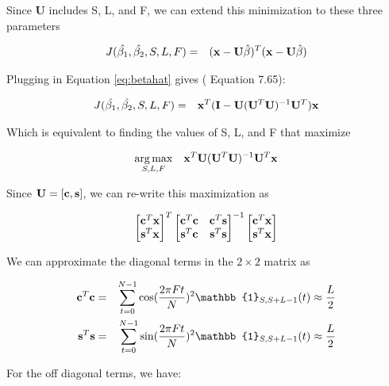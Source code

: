 \documentclass[11pt]{article}
\theoremstyle{plain}
\theoremstyle{definition}
\DeclareMathOperator*{\argmax}{arg\,max}
\begin{document}
\noindent Since {\bf U} includes S, L, and F, we can extend this minimization to these three parameters

\begin{eqnarray}
\label{eq:extendmin}
	J(\hat{\beta_1}, \hat{\beta_2}, S, L, F) &=& ({\bf x} - {\bf U} \hat{\beta})^T ({\bf x} - {\bf U} \hat{\beta})
\end{eqnarray}


\noindent Plugging in Equation \ref{eq:betahat} gives (\cite{kay1993fundamentals} Equation 7.65):

\begin{eqnarray}
	J(\hat{\beta_1}, \hat{\beta_2}, S, L, F) &=& {\bf x}^T ({\bf I} - {\bf U} ({\bf U}^T {\bf U})^{-1} {\bf U}^T) {\bf x}
\end{eqnarray}

\noindent Which is equivalent to finding the values of S, L, and F that maximize

\begin{eqnarray}
	\argmax_{S, L, F} && {\bf x}^{T} {\bf U} ({\bf U}^T {\bf U})^{-1} {\bf U}^T {\bf x}
\end{eqnarray}

\noindent Since ${\bf U} = [{\bf c}, {\bf s}]$, we can re-write this maximization as

$$
\begin{bmatrix}
{\bf c}^T {\bf x} \\
{\bf s}^T {\bf x} 
\end{bmatrix}^T
\begin{bmatrix}
{\bf c}^T {\bf c} & {\bf c}^T {\bf s} \\ 
{\bf s}^T {\bf c} & {\bf s}^T {\bf s}
\end{bmatrix}^{-1}
\begin{bmatrix}
{\bf c}^T {\bf x} \\
{\bf s}^T {\bf x} 
\end{bmatrix}
$$

\noindent We can approximate the diagonal terms in the $2 \times 2$ matrix as

\begin{eqnarray}
	{\bf c}^T {\bf c} &=& \sum_{t=0}^{N-1} \cos(\frac{2 \pi F t}{N})^2 \mathbb{1}_{S, S+L-1}(t) \approx \frac{L}{2} \nonumber \\
	{\bf s}^T {\bf s} &=& \sum_{t=0}^{N-1} \sin(\frac{2 \pi F t}{N})^2 \mathbb{1}_{S, S+L-1}(t) \approx \frac{L}{2} \nonumber 
\end{eqnarray}

\noindent For the off diagonal terms, we have:
\end{document}
